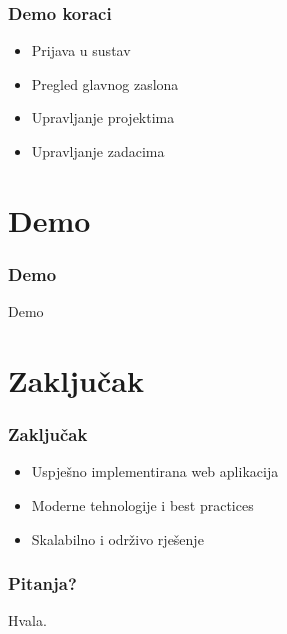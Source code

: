 \documentclass[aspectratio=169]{beamer}
\begin{document}
\begin{frame}
    \frametitle{Demo koraci}
    \begin{itemize}
        \item Prijava u sustav
        \item Pregled glavnog zaslona
        \item Upravljanje projektima
        \item Upravljanje zadacima
    \end{itemize}
\end{frame}

\section{Demo}

\begin{frame}
    \frametitle{Demo}
    \begin{center}
        {\Huge Demo}
    \end{center}
\end{frame}

\section{Zaključak}

\begin{frame}
    \frametitle{Zaključak}
    \begin{itemize}
        \item Uspješno implementirana web aplikacija
        \item Moderne tehnologije i best practices
        \item Skalabilno i održivo rješenje
    \end{itemize}
\end{frame}

\begin{frame}
    \frametitle{Pitanja?}
    \begin{center}
        \Huge Hvala.
    \end{center}
\end{frame}
\end{document}
